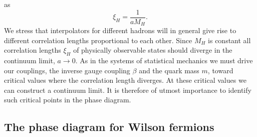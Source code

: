 as
\begin{equation}
\xi_H = \frac{1}{aM_H}.
\end{equation}
We stress that interpolators for different hadrons will in general give rise to
different correlation lengths proportional to each other. Since $M_H$ is
constant all correlation lengths $\xi_H$ of physically observable states should
diverge in the continuum limit, $a \to 0$. As in the systems of statistical
mechanics we must drive our couplings, the inverse gauge coupling $\beta$ and
the quark mass $m$, toward critical values where the correlation length
diverges. At these critical values we can construct a continuum limit. It is
therefore of utmost importance to identify such critical points in the phase
diagram.

\subsection{The phase diagram for Wilson fermions}

